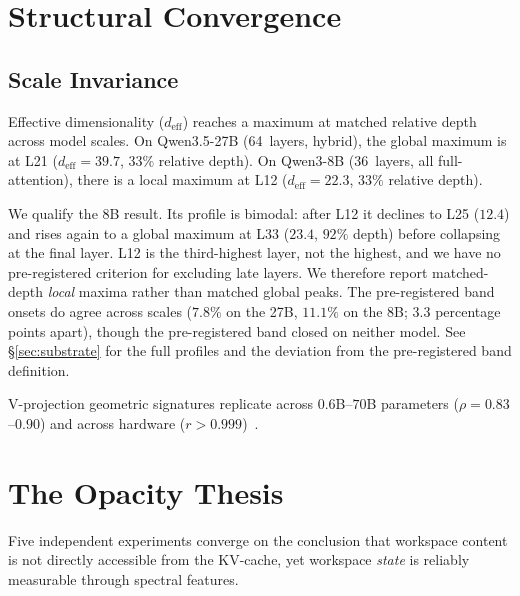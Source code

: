 \documentclass[11pt,a4paper]{article}
\begin{document}
\section{Structural Convergence}
\label{sec:structure}

\subsection{Scale Invariance}

Effective dimensionality ($d_\text{eff}$) reaches a maximum at
matched relative depth across model scales. On Qwen3.5-27B
(64~layers, hybrid), the global maximum is at L21
($d_\text{eff}{=}39.7$, $33\%$ relative depth). On Qwen3-8B
(36~layers, all full-attention), there is a local maximum at L12
($d_\text{eff}{=}22.3$, $33\%$ relative depth).

We qualify the 8B result. Its profile is bimodal: after L12 it
declines to L25 ($12.4$) and rises again to a global maximum at L33
($23.4$, $92\%$ depth) before collapsing at the final layer. L12 is
the third-highest layer, not the highest, and we have no
pre-registered criterion for excluding late layers. We therefore
report matched-depth \emph{local} maxima rather than matched global
peaks. The pre-registered band onsets do agree across scales
($7.8\%$ on the 27B, $11.1\%$ on the 8B; $3.3$ percentage points
apart), though the pre-registered band closed on neither model.
See \S\ref{sec:substrate} for the full profiles and the deviation
from the pre-registered band definition.

V-projection geometric signatures replicate across $0.6$B--$70$B
parameters ($\rho{=}0.83$--$0.90$) and across hardware
($r{>}0.999$)~\citep{lyra2026campaign2}.





\section{The Opacity Thesis}
\label{sec:opacity}

Five independent experiments converge on the conclusion that workspace
content is not directly accessible from the KV-cache, yet workspace
\emph{state} is reliably measurable through spectral features.
\end{document}
